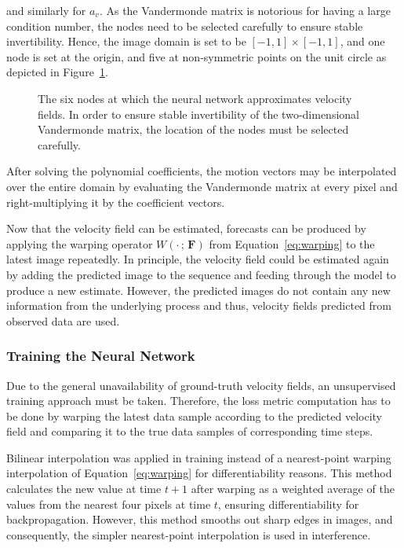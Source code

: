 and similarly for $a_v$.
As the Vandermonde matrix is notorious for having a large condition number, the nodes need to be selected carefully to ensure stable invertibility.
Hence, the image domain is set to be $[-1, 1] \times [-1,1]$, and one node is set at the origin, and five at non-symmetric points on the unit circle as depicted in Figure~\ref{fig:testpoints}.
\begin{figure}[H]
    \centering
    
    \caption{\label{fig:testpoints}The six nodes at which the neural network approximates velocity fields. In order to ensure stable invertibility of the two-dimensional Vandermonde matrix, the location of the nodes must be selected carefully.}
\end{figure}
After solving the polynomial coefficients, the motion vectors may be interpolated over the entire domain by evaluating the Vandermonde matrix at every pixel and right-multiplying it by the coefficient vectors.  

Now that the velocity field can be estimated, forecasts can be produced by applying the warping operator $W(\cdot \, ; \, \mathbf{F})$ from Equation~\eqref{eq:warping} to the latest image repeatedly.
In principle, the velocity field could be estimated again by adding the predicted image to the sequence and feeding through the model to produce a new estimate.
However, the predicted images do not contain any new information from the underlying process and thus, velocity fields predicted from observed data are used.

\subsubsection{Training the Neural Network}
Due to the general unavailability of ground-truth velocity fields, an unsupervised training approach must be taken.
Therefore, the loss metric computation has to be done by warping the latest data sample according to the predicted velocity field and comparing it to the true data samples of corresponding time steps.

Bilinear interpolation was applied in training instead of a nearest-point warping interpolation of Equation~\eqref{eq:warping} for differentiability reasons.
This method calculates the new value at time $t+1$ after warping as a weighted average of the values from the nearest four pixels at time $t$, ensuring differentiability for backpropagation.
However, this method smooths out sharp edges in images, and consequently, the simpler nearest-point interpolation is used in interference.

